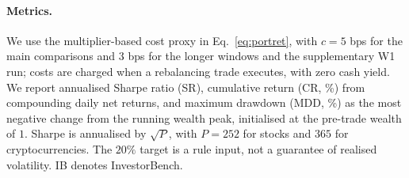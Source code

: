 \paragraph{Metrics.}
We use the multiplier-based cost proxy in Eq.~\eqref{eq:portret}, with $c=5$ bps for the main comparisons and $3$ bps for the longer windows and the supplementary W1 run; costs are charged when a rebalancing trade executes, with zero cash yield. We report annualised Sharpe ratio (SR), cumulative return (CR, \%) from compounding daily net returns, and maximum drawdown (MDD, \%) as the most negative change from the running wealth peak, initialised at the pre-trade wealth of $1$. Sharpe is annualised by $\sqrt P$, with $P=252$ for stocks and $365$ for cryptocurrencies. The $20\%$ target is a rule input, not a guarantee of realised volatility. IB denotes InvestorBench.

